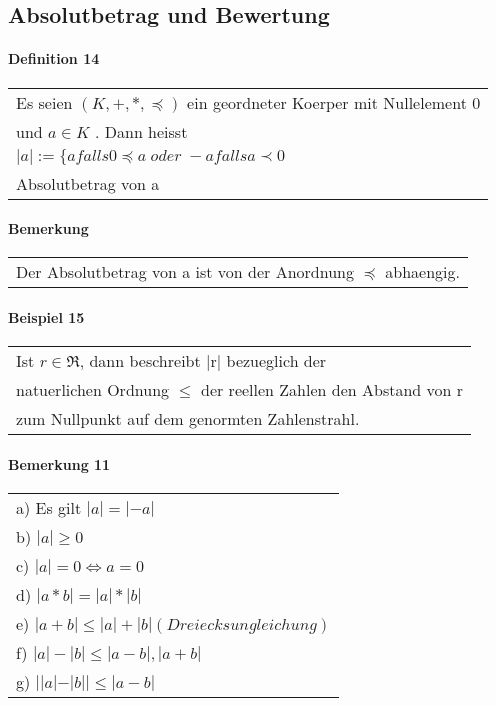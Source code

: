 \documentclass[a4paper]{scrartcl}
\begin{document}
\subsection{Absolutbetrag und Bewertung}

\paragraph{Definition 14}
\begin{tabbing}
\begin{tabular}{l}
Es seien $(K,+,*,\preceq)$ ein geordneter Koerper mit Nullelement 0\\
und $a\in K$ . Dann heisst\\
$|a|:=\lbrace a falls 0 \preceq a\; oder\; -a falls a\prec 0$ \\
Absolutbetrag von a
\end{tabular}
\end{tabbing}

\paragraph{Bemerkung}
\begin{tabbing}
\begin{tabular}{l}
Der Absolutbetrag von a ist von der Anordnung $\preceq$ abhaengig.
\end{tabular}
\end{tabbing}

\paragraph{Beispiel 15}
\begin{tabbing}
\begin{tabular}{l}
Ist $r\in \Re$, dann beschreibt |r| bezueglich der\\
natuerlichen Ordnung $\leq$ der reellen Zahlen den Abstand von r\\
zum Nullpunkt auf dem genormten Zahlenstrahl.
\end{tabular}
\end{tabbing}

\paragraph{Bemerkung 11}
\begin{tabbing}
\begin{tabular}{l}
a) Es gilt $|a|=|-a|$\\
b) $|a| \geq 0$\\
c) $|a| = 0 \Leftrightarrow a=0$\\
d) $|a*b| = |a|*|b|$\\
e) $|a+b| \leq |a|+|b| (Dreiecksungleichung)$\\
f) $|a|-|b| \leq |a-b|,|a+b|$\\
g) $||a|-|b|| \leq  |a-b|$\\
\end{tabular}
\end{tabbing}
\end{document}
